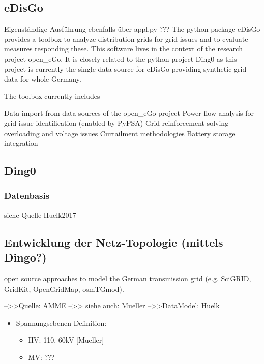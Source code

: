 \documentclass[
a4paper,     %
12pt         %
]{scrartcl}  %
\begin{document}
\subsection{eDisGo}
Eigenständige Ausführung ebenfalls über appl.py ???
The python package eDisGo provides a toolbox to analyze distribution grids for grid issues and to evaluate measures responding these. This software lives in the context of the research project open\_eGo. It is closely related to the python project Ding0 as this project is currently the single data source for eDisGo providing synthetic grid data for whole Germany.

The toolbox currently includes

Data import from data sources of the open\_eGo project
Power flow analysis for grid issue identification (enabled by PyPSA)
Grid reinforcement solving overloading and voltage issues
Curtailment methodologies
Battery storage integration


\subsection{Ding0}
\subsubsection{Datenbasis}
siehe Quelle Huelk2017
\subsection{Entwicklung der Netz-Topologie (mittels Dingo?)}
\label{netz-topo_dingo}
open source approaches to model
the German transmission grid (e.g. SciGRID, GridKit, OpenGridMap, osmTGmod).

-->>Quelle: AMME
-->> siehe auch: Mueller
-->>DataModel: Huelk
\begin{itemize}
	\item[] Spannungsebenen-Definition:
	\begin{itemize}
		\item HV: 110, 60kV [Mueller]
		\item MV: ???
	\end{itemize}
	
\end{itemize}
\end{document}
